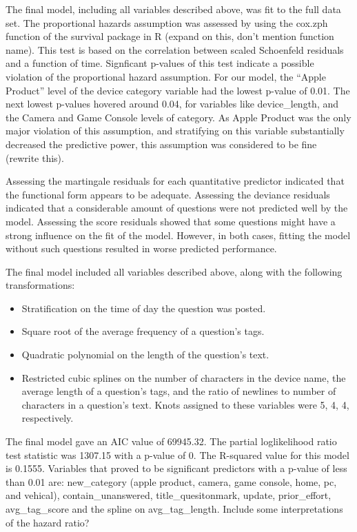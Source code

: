 \documentclass[12pt]{article}
\begin{document}
The final model, including all variables described above, was fit to the full data set.
The proportional hazards assumption was assessed by using the cox.zph function of the survival package in R (expand on this, don't mention function name). This test is based on the correlation between scaled Schoenfeld residuals and a function of time. Signficant p-values of this test indicate a possible violation of the proportional hazard assumption. For our model, the ``Apple Product'' level of the device category variable had the lowest p-value of 0.01. The next lowest p-values hovered around 0.04, for variables like device\_length, and the Camera and Game Console levels of category. As Apple Product was the only major violation of this assumption, and stratifying on this variable substantially decreased the predictive power, this assumption was considered to be fine (rewrite this). 

Assessing the martingale residuals for each quantitative predictor indicated that the functional form appears to be adequate. Assessing the deviance residuals indicated that a considerable amount of questions were not predicted well by the model. Assessing the score residuals showed that some questions might have a strong influence on the fit of the model. However, in both cases, fitting the model without such questions resulted in worse predicted performance. 

The final model included all variables described above, along with the following transformations: 

\begin{itemize}
  \item Stratification on the time of day the question was posted. 
  \item Square root of the average frequency of a question's tags. 
  \item Quadratic polynomial on the length of the question's text. 
  \item Restricted cubic splines on the number of characters in the device name, the average length of a question's tags, and the ratio of newlines to number of characters in a question's text. Knots assigned to these variables were 5, 4, 4, respectively. 
\end{itemize}

The final model gave an AIC value of 69945.32. The partial loglikelihood ratio test statistic was 1307.15 with a p-value of 0. The R-squared value for this model is 0.1555. Variables that proved to be significant predictors with a p-value of less than 0.01 are: new_category (apple product, camera, game console, home, pc, and vehical), contain_unanswered, title_quesitonmark, update, prior_effort, avg_tag_score and the spline on avg_tag_length. Include some interpretations of the hazard ratio? 
\end{document}
